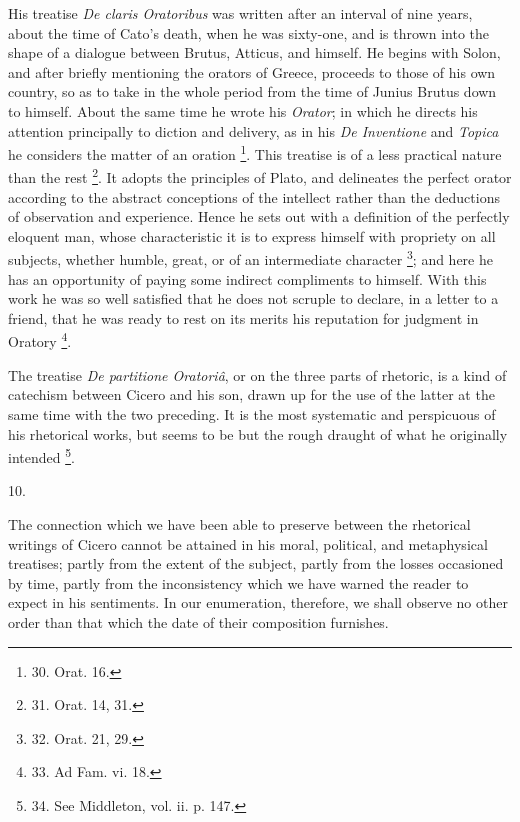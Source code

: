 His treatise \emph{De claris
Oratoribus} was written after an interval of nine years, about the
time of Cato's death, when he was sixty-one, and is thrown into the
shape of a dialogue between Brutus, Atticus, and himself. He begins
with Solon, and after briefly mentioning the orators of Greece,
proceeds to those of his own country, so as to take in the whole
period from the time of Junius Brutus down to himself. About the same
time he wrote his \emph{Orator}; in which he directs his attention
principally to diction and delivery, as in his \emph{De Inventione}
and \emph{Topica} he considers the matter of an oration \footnote{30.
Orat. 16.}.
This treatise is of a less practical nature than the rest \footnote{31. Orat. 14, 31.}.
It adopts the principles of Plato, and delineates the perfect orator
according to the abstract conceptions of the intellect rather than the
deductions of observation and experience. Hence he sets out with a
definition of the perfectly eloquent man, whose characteristic it is
to express himself with propriety on all subjects, whether humble,
great, or of an intermediate character \footnote{32. Orat. 21, 29.}; and here he has an
opportunity of paying some indirect compliments to himself. With this
work he was so well satisfied that he does not scruple to declare, in
a letter to a friend, that he was ready to rest on its merits his
reputation for judgment in Oratory \footnote{33. Ad Fam. vi. 18.}.

The treatise \emph{De partitione
Oratoriâ}, or on the three parts of rhetoric, is a kind of
catechism between Cicero and his son, drawn up for the use of the
latter at the same time with the two preceding. It is the most
systematic and perspicuous of his rhetorical works, but seems to be
but the rough draught of what he originally intended \footnote{34. See
Middleton, vol. ii. p.
147.}.

10.

The connection which we have
been able to preserve between the rhetorical writings of Cicero cannot
be attained in his moral, political, and metaphysical treatises;
partly from the extent of the subject, partly from the losses
occasioned by time, partly from the inconsistency which we have warned
the reader to expect in his sentiments. In our enumeration, therefore,
we shall observe no other order than that which the date of their
composition furnishes.

